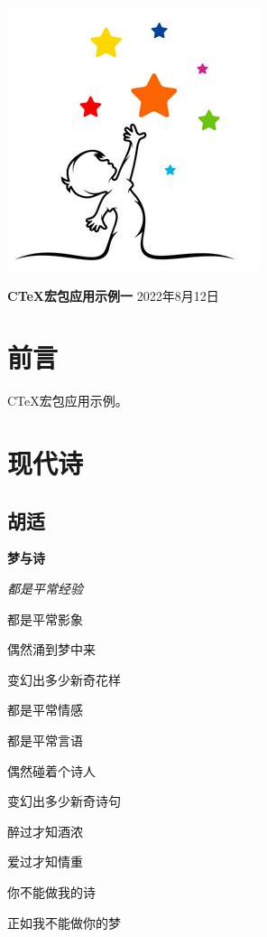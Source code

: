 \documentclass[oneside, UTF8, fontset = adobe]{ctexbook}
\begin{document}
\begin{titlepage}
  \quad

  \vspace{.15\textheight}
  \begin{center}
    \includegraphics[width = .2\textwidth]{images/cover.png}

    \huge\textbf{CTeX宏包应用示例一}
    \vfill
    \normalsize 2022年8月12日
  \end{center}  
\end{titlepage}


\frontmatter%

\chapter{前言}
CTeX宏包应用示例。


\tableofcontents%


\mainmatter

%


\chapter{现代诗}

\section{胡适}

\large\textbf{梦与诗}\normalsize

\vspace{2ex}\itshape
都是平常经验

都是平常影象

偶然涌到梦中来

变幻出多少新奇花样

\vspace{2ex}
都是平常情感

都是平常言语

偶然碰着个诗人

变幻出多少新奇诗句

\vspace{2ex}
醉过才知酒浓

爱过才知情重

你不能做我的诗

正如我不能做你的梦
\end{document}
